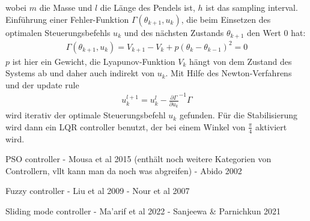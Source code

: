 wobei $m$ die Masse und $l$ die Länge des Pendels ist, $h$ ist das sampling interval. Einführung einer Fehler-Funktion $\Gamma(\theta_{k+1}, u_k)$, die beim Einsetzen des optimalen Steuerungsbefehls $u_k$ und des nächsten Zustands $\theta_{k+1}$ den Wert 0 hat:
\begin{align}
    \Gamma(\theta_{k+1}, u_k) = V_{k+1} - V_k + p(\theta_k - \theta_{k-1})^2 = 0
\end{align}
$p$ ist hier ein Gewicht, die Lyapunov-Funktion $V_k$ hängt von dem Zustand des Systems ab und daher auch indirekt von $u_k$. Mit Hilfe des Newton-Verfahrens und der update rule
\begin{align}
    u_{k}^{l+1} = u_k^l - \frac{\partial\Gamma}{\partial u_k}^{-1}\Gamma
\end{align}
wird iterativ der optimale Steuerungsbefehl $u_k$ gefunden. Für die Stabilisierung wird dann ein LQR controller benutzt, der bei einem Winkel von $\frac{\pi}{4}$ aktiviert wird.

PSO controller
- Mousa et al 2015 (enthält noch weitere Kategorien von Controllern, vllt kann man da noch was abgreifen)
- Abido 2002

Fuzzy controller
- Liu et al 2009
- Nour et al 2007

Sliding mode controller
- Ma'arif et al 2022
- Sanjeewa & Parnichkun 2021
